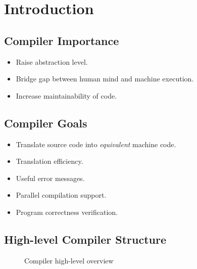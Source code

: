 \section{Introduction}

\subsection{Compiler Importance}
\begin{itemize}
    \item Raise abstraction level.
    \item Bridge gap between human mind and machine execution.
    \item Increase maintainability of code.
\end{itemize}

\subsection{Compiler Goals}
\begin{itemize}
    \item Translate source code into \textit{equivalent} machine code.
    \item Translation efficiency.
    \item Useful error messages.
    \item Parallel compilation support.
    \item Program correctness verification.
\end{itemize}

\subsection{High-level Compiler Structure}
\begin{figure}[H]
    \centering
    \caption{Compiler high-level overview}
    \label{fig:compiler-high-level-overview}
\end{figure}

